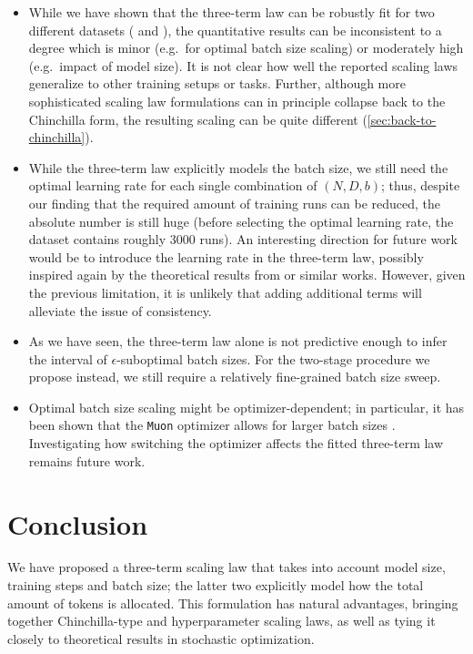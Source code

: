 \documentclass[12pt,a4paper,twoside]{article}
\begin{document}
\begin{itemize}
    \item While we have shown that the three-term law can be robustly fit for two different datasets (\li{} and \oellm{}), the quantitative results can be inconsistent to a degree which is minor (e.g.\ for optimal batch size scaling) or moderately high (e.g.\ impact of model size). It is not clear how well the reported scaling laws generalize to other training setups or tasks. Further, although more sophisticated scaling law formulations can in principle collapse back to the Chinchilla form, the resulting scaling can be quite different (\cref{sec:back-to-chinchilla}).
    \item While the three-term law explicitly models the batch size, we still need the optimal learning rate for each single combination of $(N,D,b)$; thus, despite our finding that the required amount of training runs can be reduced, the absolute number is still huge (before selecting the optimal learning rate, the \li{} dataset contains roughly 3000 runs). An interesting direction for future work would be to introduce the learning rate in the three-term law, possibly inspired again by the theoretical results from \citet{Shulgin2026} or similar works. However, given the previous limitation, it is unlikely that adding additional terms will alleviate the issue of consistency.    
    \item As we have seen, the three-term law alone is not predictive enough to infer the interval of $\epsilon$-suboptimal batch sizes. For the two-stage procedure we propose instead, we still require a relatively fine-grained batch size sweep.
    \item Optimal batch size scaling might be optimizer-dependent; in particular, it has been shown that the \texttt{Muon} optimizer \citep{Jordan2024} allows for larger batch sizes \citep{EssentialAI2025}. Investigating how switching the optimizer affects the fitted three-term law remains future work.
\end{itemize}

\section{Conclusion}

We have proposed a three-term scaling law that takes into account model size, training steps and batch size; the latter two explicitly model how the total amount of tokens is allocated. This formulation has natural advantages, bringing together Chinchilla-type and hyperparameter scaling laws, as well as tying it closely to theoretical results in stochastic optimization.
\end{document}

